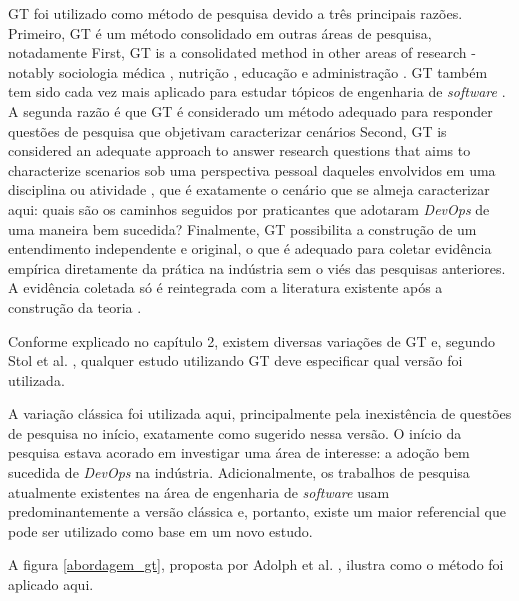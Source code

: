 \acrshort{GT} foi utilizado como método de pesquisa devido a três principais
razões. Primeiro, \acrshort{GT} é um método consolidado em outras áreas de
pesquisa, notadamente First, GT is a consolidated method in other areas of research -
notably sociologia médica \cite{}, nutrição \cite{}, educação \cite{} e
administração \cite{}. \acrshort{GT} também tem sido cada vez mais aplicado
para estudar tópicos de engenharia de \textit{software} \cite{}. A segunda
razão é que \acrshort{GT} é considerado um método adequado para responder
questões de pesquisa que objetivam caracterizar cenários Second, GT is considered
an adequate approach to answer research questions that aims to
characterize scenarios sob uma perspectiva pessoal daqueles envolvidos em uma
disciplina ou atividade \cite{gt_software_eng}, que é exatamente o cenário que
se almeja caracterizar aqui: quais são os caminhos seguidos por praticantes que
adotaram \textit{DevOps} de uma maneira bem sucedida? Finalmente, \acrshort{GT}
possibilita a construção de um entendimento independente e original, o que é
adequado para coletar evidência empírica diretamente da prática na indústria
sem o viés das pesquisas anteriores. A evidência coletada só é reintegrada com
a literatura existente após a construção da teoria \cite{}.

Conforme explicado no capítulo 2, existem diversas variações de \acrshort{GT} e,
segundo Stol et al. \cite{}, qualquer estudo utilizando \acrshort{GT} deve
especificar qual versão foi utilizada.

A variação clássica foi utilizada aqui, principalmente pela inexistência de
questões de pesquisa no início, exatamente como sugerido nessa versão. O início
da pesquisa estava acorado em investigar uma área de interesse: a adoção bem
sucedida de \textit{DevOps} na indústria. Adicionalmente, os trabalhos de
pesquisa atualmente existentes na área de engenharia de \textit{software} usam
predominantemente a versão clássica \cite{} e, portanto, existe um maior
referencial que pode ser utilizado como base em um novo estudo.

A figura \ref{abordagem_gt}, proposta por Adolph et al. \cite{using_gt_adolph},
ilustra como o método foi aplicado aqui.

%
